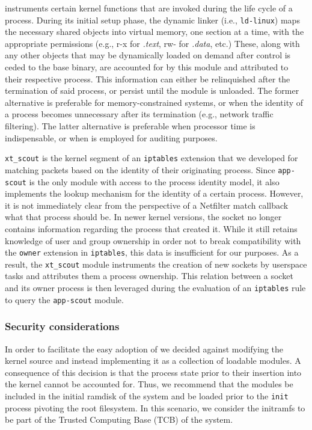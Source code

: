 \scout{} instruments certain kernel functions that are invoked during the life
cycle of a process. During its initial setup phase, the dynamic linker (i.e.,
\texttt{ld-linux}) maps the necessary shared objects into virtual memory, one
section at a time, with the appropriate permissions (e.g., r-x for
\textit{.text}, rw- for \textit{.data}, etc.) These, along with any other
objects that may be dynamically loaded on demand after control is ceded to the
base binary, are accounted for by this module and attributed to their respective
process. This information can either be relinquished after the termination of
said process, or persist until the module is unloaded. The former alternative is
preferable for memory-constrained systems, or when the identity of a process
becomes unnecessary after its termination (e.g., network traffic filtering).
The latter alternative is preferable when processor time is indispensable, or
when \scout{} is employed for auditing purposes.

\texttt{xt\_scout} is the kernel segment of an \texttt{iptables} extension that
we developed for matching packets based on the identity of their originating
process. Since \texttt{app-scout} is the only module with access to the process
identity model, it also implements the lookup mechanism for the identity of a
certain process. However, it is not immediately clear from the perspective of a
Netfilter match callback what that process should be. In newer kernel versions,
the socket no longer contains information regarding the process that created it.
While it still retains knowledge of user and group ownership in order not to
break compatibility with the \texttt{owner} extension in \texttt{iptables}, this
data is insufficient for our purposes. As a result, the \texttt{xt\_scout}
module instruments the creation of new sockets by userspace tasks and attributes
them a process ownership. This relation between a socket and its owner process
is then leveraged during the evaluation of an \texttt{iptables} rule to query
the \texttt{app-scout} module.


\subsubsection{Security considerations}

In order to facilitate the easy adoption of \scout{} we decided against
modifying the kernel source and instead implementing it as a collection of
loadable modules. A consequence of this decision is that the process state prior
to their insertion into the kernel cannot be accounted for. Thus, we recommend
that the \scout{} modules be included in the initial ramdisk of the system and
be loaded prior to the \texttt{init} process pivoting the root filesystem. In
this scenario, we consider the initramfs to be part of the Trusted Computing
Base (TCB) of the system.

